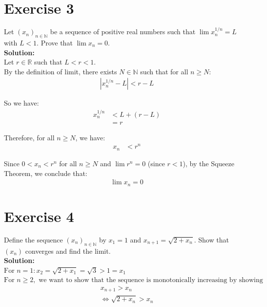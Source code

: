 \documentclass{article}
\begin{document}
\newpage

\section*{Exercise 3}
Let $(x_n)_{n \in \mathbb{N}}$ be a sequence of positive real numbers such that $\lim x_n^{1/n} = L$ with $L < 1$. Prove that $\lim x_n = 0$. \\

\textbf{Solution:} \\

Let $r \in \mathbb{R}$ such that $L < r < 1$. \\

By the definition of limit, there exists $N \in \mathbb{N}$ such that for all $n \geq N$:
\begin{align*}
|x_n^{1/n} - L| < r - L
\end{align*}

So we have:
\begin{align*}
x_n^{1/n} &< L + (r - L)\\
&= r
\end{align*}

Therefore, for all $n \geq N$, we have:
\begin{align*}
x_n &< r^n
\end{align*}

Since $0 < x_n < r^n$ for all $n \geq N$ and $\lim r^n = 0$ (since $r < 1$), by the Squeeze Theorem, we conclude that:
\begin{align*}
\lim x_n = 0
\end{align*}

\newpage

\section*{Exercise 4}
Define the sequence $(x_n)_{n \in \mathbb{N}}$ by $x_1 = 1$ and $x_{n+1} = \sqrt{2 + x_n}$. Show that $(x_n)$ converges and find the limit. \\

\textbf{Solution:} \\

$\text{For } n = 1: x_2 = \sqrt{2 + x_1} = \sqrt{3} > 1 = x_1$ \\

$\text{For } n \geq 2, \text{ we want to show that the sequence is monotonically increasing by showing }$
\begin{align*}
    x_{n+1} > x_n \\ 
    \Leftrightarrow \sqrt{2 + x_n} > x_n
\end{align*}
\end{document}

